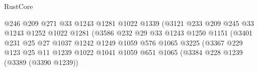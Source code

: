 \begin{lexlean}{RustCore}
\begin{coremodule}
                                          @246
                                          @209
                                          @271
                                          @33
                                          @1243
                                          @1281
                                          @1022
                                          @1339
                                          (@3121
                                            @233
                                            @209
                                            @245
                                            @33
                                            @1243
                                            @1252
                                            @1022
                                            @1281
                                            (@3586
                                              @232
                                              @29
                                              @33
                                              @1243
                                              @1250
                                              @1151
                                              (@3401
                                                @231
                                                @25
                                                @27
                                                @1037
                                                @1242
                                                @1249
                                                @1059
                                                @576
                                                @1065
                                                @3225
                                                (@3367
                                                  @229
                                                  @123
                                                  @25
                                                  @11
                                                  @1239
                                                  @1022
                                                  @1041
                                                  @1059
                                                  @651
                                                  @1065
                                                  (@3384
                                                    @228
                                                    @1239
                                                    (@3389 (@3390 @1239))

\end{coremodule}
\end{lexlean}
